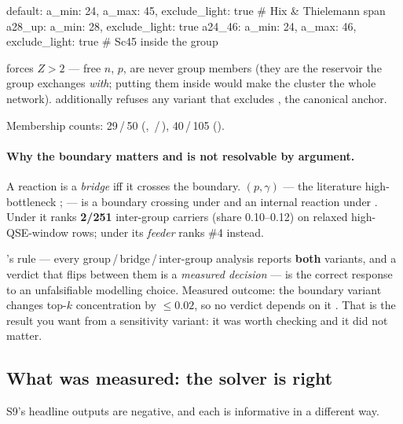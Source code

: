 \begin{srclisting}
default: {a_min: 24, a_max: 45, exclude_light: true}   # Hix & Thielemann span
a28_up:  {a_min: 28,            exclude_light: true}
a24_46:  {a_min: 24, a_max: 46, exclude_light: true}   # Sc45 inside the group
\end{srclisting}

 forces $Z > 2$ --- free $n$, $p$,  are
never group members (they are the reservoir the group exchanges \emph{with};
putting them inside would make the cluster the whole network).
 additionally refuses any variant that excludes
, the canonical anchor.

Membership counts: 29\,/\,50 (, \,/\,),
40\,/\,105 (). 

\paragraph{Why the boundary matters and is not resolvable by argument.} A
reaction is a \emph{bridge} iff it crosses the boundary.
$(p,\gamma)$ --- the literature high-\Ye{} bottleneck
\citep[\S VIb]{wac1973}; \citep{ht1996} --- is a boundary crossing under
 and an internal reaction under . Under
 it ranks \textbf{2/251} inter-group carriers (share 0.10--0.12)
on relaxed high-\Ye{} QSE-window rows; under  its \emph{feeder}
 ranks \#4 instead. 

's rule --- every group\,/\,bridge\,/\,inter-group analysis
reports \textbf{both} variants, and a verdict that flips between them is a
\emph{measured decision} --- is the correct response to an unfalsifiable
modelling choice. Measured outcome: the boundary variant changes top-$k$
concentration by $\le 0.02$, so no verdict depends on it
. That is the result you want from a sensitivity variant:
it was worth checking and it did not matter.

\subsection{What was measured: the solver is right}
\label{sec:solververify}

S9's headline outputs are negative, and each is informative in a different way.

